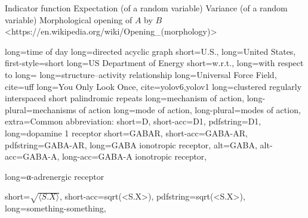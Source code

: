 \NomMath {\indicator} {Indicator function}
 {Expectation (of a random variable)}
 {Variance (of a random variable)}
 {Morphological opening of $A$ by $B$}<https://en.wikipedia.org/wiki/Opening\_(morphology)>




 {long=time of day}  %
 {long=directed acyclic graph}
 {
    short=U.S.,
    long=United States,
    first-style=short     %
}
 {long=\acs{US} Department of Energy}
 {short=w.r.t., long=with respect to}
 {long=}
 {long=structure–activity relationship}  %
 {long=Universal Force Field, cite=uff}
 {long=You Only Look Once, cite={yolov6,yolov1}}
 {long=clustered regularly interspaced short palindromic repeats}
 {
    long=mechanism of action,
	long-plural=mechanisms of action
}
 {
    long=mode of action,
	long-plural=modes of action,
	extra={Common abbreviation: }
}
 {
    short=D,
    short-acc=D1,
    pdfstring=D1,
    long=dopamine 1 receptor
}
 {
    short=GABAR,
    short-acc=GABA-AR,
    pdfstring=GABA-AR,
    long=GABA ionotropic receptor,
    alt=GABA,
    alt-acc=GABA-A,
    long-acc=GABA-A ionotropic receptor,
}

 {long=α-adrenergic receptor}

 {
    short=$\sqrt{\langle S . X \rangle }$,
    short-acc=sqrt(<S.X>),
    pdfstring=sqrt(<S.X>),
    long=something-something,
}
